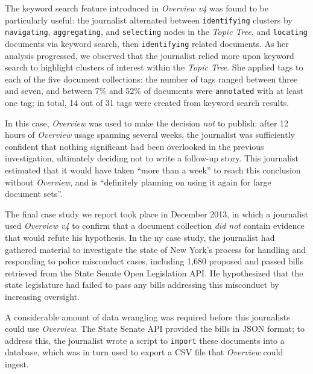 The keyword search feature introduced in {\it Overview v4} was found to be particularly useful: the journalist alternated between {\tt identifying} clusters by {\tt navigating}, {\tt aggregating}, and {\tt selecting} nodes in the {\it Topic Tree}, and {\tt locating} documents via keyword search, then {\tt identifying} related documents.
As her analysis progressed, we observed that the journalist relied more upon keyword search to highlight clusters of interest within the {\it Topic Tree}.
She applied tags to each of the five document collections: the number of tags ranged between three and seven, and between 7\% and 52\% of documents were {\tt annotated} with at least one tag; in total, 14 out of 31 tags were created from keyword search results.

In this case, {\it Overview} was used to make the decision {\it not} to publish: after 12 hours of {\it Overview} usage spanning several weeks, the journalist was sufficiently confident that nothing significant had been overlooked in the previous investigation, ultimately deciding not to write a follow-up story.
This journalist estimated that it would have taken ``more than a week'' to reach this conclusion without {\it Overview}, and is ``definitely planning on using it again for large document sets''.

The final case study we report took place in December 2013, in which a journalist used {\it Overview v4} to confirm that a document collection {\it did not} contain evidence that would refute his hypothesis.
In the {\sc ny} case study, the journalist had gathered material to investigate the state of New York's process for handling and responding to police misconduct cases, including 1,680 proposed and passed bills retrieved from the State Senate Open Legislation \ac{API}. 
He hypothesized that the state legislature had failed to pass any bills addressing this misconduct by increasing oversight.

A considerable amount of data wrangling was required before this journalists could use {\it Overview}. 
The State Senate \ac{API} provided the bills in \ac{JSON} format; to address this, the journalist wrote a script to {\tt import} these documents into a database, which was in turn used to export a \ac{CSV} file that {\it Overview} could ingest. 

